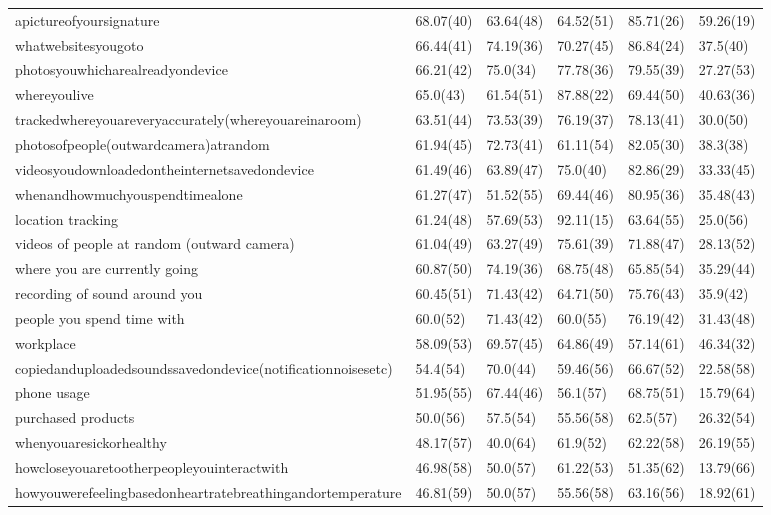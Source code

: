 \documentclass[a4paper,12pt]{article}
\begin{document}
\begin{longtable}{| p{7cm} | l | l | l | l | l |}
apictureofyoursignature & 68.07(40) & 63.64(48) & 64.52(51) & 85.71(26) & 59.26(19) \\ 
whatwebsitesyougoto & 66.44(41) & 74.19(36) & 70.27(45) & 86.84(24) & 37.5(40) \\ 
photosyouwhicharealreadyondevice & 66.21(42) & 75.0(34) & 77.78(36) & 79.55(39) & 27.27(53) \\ 
whereyoulive & 65.0(43) & 61.54(51) & 87.88(22) & 69.44(50) & 40.63(36) \\ 
trackedwhereyouareveryaccurately(whereyouareinaroom) & 63.51(44) & 73.53(39) & 76.19(37) & 78.13(41) & 30.0(50) \\ 
photosofpeople(outwardcamera)atrandom & 61.94(45) & 72.73(41) & 61.11(54) & 82.05(30) & 38.3(38) \\ 
videosyoudownloadedontheinternetsavedondevice & 61.49(46) & 63.89(47) & 75.0(40) & 82.86(29) & 33.33(45) \\ 
whenandhowmuchyouspendtimealone & 61.27(47) & 51.52(55) & 69.44(46) & 80.95(36) & 35.48(43) \\ 
location tracking & 61.24(48) & 57.69(53) & 92.11(15) & 63.64(55) & 25.0(56) \\ 
videos of people at random (outward camera) & 61.04(49) & 63.27(49) & 75.61(39) & 71.88(47) & 28.13(52) \\ 
where you are currently going & 60.87(50) & 74.19(36) & 68.75(48) & 65.85(54) & 35.29(44) \\ 
recording of sound around you & 60.45(51) & 71.43(42) & 64.71(50) & 75.76(43) & 35.9(42) \\ 
people you spend time with & 60.0(52) & 71.43(42) & 60.0(55) & 76.19(42) & 31.43(48) \\ 
workplace & 58.09(53) & 69.57(45) & 64.86(49) & 57.14(61) & 46.34(32) \\ 
copiedanduploadedsoundssavedondevice(notificationnoisesetc) & 54.4(54) & 70.0(44) & 59.46(56) & 66.67(52) & 22.58(58) \\ 
phone usage & 51.95(55) & 67.44(46) & 56.1(57) & 68.75(51) & 15.79(64) \\ 
purchased products & 50.0(56) & 57.5(54) & 55.56(58) & 62.5(57) & 26.32(54) \\ 
whenyouaresickorhealthy & 48.17(57) & 40.0(64) & 61.9(52) & 62.22(58) & 26.19(55) \\ 
howcloseyouaretootherpeopleyouinteractwith & 46.98(58) & 50.0(57) & 61.22(53) & 51.35(62) & 13.79(66) \\ 
howyouwerefeelingbasedonheartratebreathingandortemperature & 46.81(59) & 50.0(57) & 55.56(58) & 63.16(56) & 18.92(61) \\ 

\end{longtable}
\end{document}
